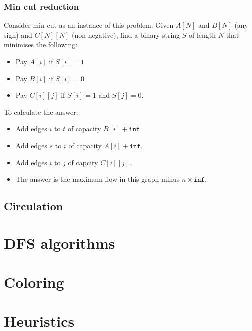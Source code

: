 	\subsubsection{Min cut reduction}
		Consider min cut as an instance of this problem: 
		Given $A[N]$ and $B[N]$ (any sign) and $C[N][N]$ (non-negative), find a binary string $S$ of length $N$ that minimises the following: \\
		\begin{itemize}[noitemsep]
		\item Pay $A[i]$ if $S[i] = 1$ 
		\item Pay $B[i]$ if $S[i] = 0$ 
		\item Pay $C[i][j]$ if $S[i] = 1$ and $S[j] = 0$. 
		\end{itemize}
		To calculate the answer: 
		\begin{itemize}[noitemsep]
		\item Add edges $i$ to $t$ of capacity $B[i] + \texttt{inf}$. 
		\item Add edges $s$ to $i$ of capacity $A[i] + \texttt{inf}$. 
		\item Add edges $i$ to $j$ of capcity $C[i][j]$. 
		\item The answer is the maximum flow in this graph minus $n \times \texttt{inf}$. 
		\end{itemize}

	\subsection{Circulation}
	


\section{DFS algorithms}

\section{Coloring}

\section{Heuristics}

